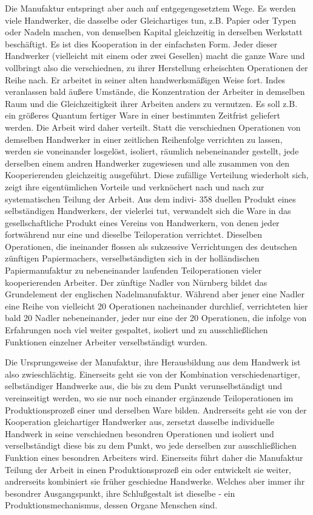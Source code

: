 {Die Manufaktur entspringt aber auch auf entgegengesetztem Wege. Es
werden viele Handwerker, die dasselbe oder Gleichartiges tun, z.B.
Papier oder Typen oder Nadeln machen, von demselben Kapital gleichzeitig
in derselben Werkstatt beschäftigt. Es ist dies Kooperation in der
einfachsten Form. Jeder dieser Handwerker (vielleicht mit einem oder
zwei Gesellen) macht die ganze Ware und vollbringt also die
verschiednen, zu ihrer Herstellung erheischten Operationen der Reihe
nach. Er arbeitet in seiner alten handwerksmäßigen Weise fort. Indes
veranlassen bald äußere Umstände, die Konzentration der Arbeiter in
demselben Raum und die Gleichzeitigkeit ihrer Arbeiten anders zu
vernutzen. Es soll z.B. ein größeres Quantum fertiger Ware in einer
bestimmten Zeitfrist geliefert werden. Die Arbeit wird daher verteilt.
Statt die verschiednen Operationen von demselben Handwerker in einer
zeitlichen Reihenfolge verrichten zu lassen, werden sie voneinander
losgelöst, isoliert, räumlich nebeneinander gestellt, jede derselben
einem andren Handwerker zugewiesen und alle zusammen von den
Kooperierenden gleichzeitig ausgeführt. Diese zufällige Verteilung
wiederholt sich, zeigt ihre eigentümlichen Vorteile und verknöchert nach
und nach zur systematischen Teilung der Arbeit. Aus dem indivi-
\num{358} duellen Produkt eines selbständigen
Handwerkers, der vielerlei tut, verwandelt sich die Ware in das
gesellschaftliche Produkt eines Vereins von Handwerkern, von denen jeder
fortwährend nur eine und dieselbe Teiloperation verrichtet. Dieselben
Operationen, die ineinander flossen als sukzessive Verrichtungen des
deutschen zünftigen Papiermachers, verselbständigten sich in der
holländischen Papiermanufaktur zu nebeneinander laufenden
Teiloperationen vieler kooperierenden Arbeiter. Der zünftige Nadler von
Nürnberg bildet das Grundelement der englischen Nadelmanufaktur. Während
aber jener eine Nadler eine Reihe von vielleicht 20 Operationen
nacheinander durchlief, verrichteten hier bald 20 Nadler nebeneinander,
jeder nur eine der 20 Operationen, die infolge von Erfahrungen noch viel
weiter gespaltet, isoliert und zu ausschließlichen Funktionen einzelner
Arbeiter verselbständigt wurden.

Die Ursprungsweise der Manufaktur, ihre Herausbildung aus dem Handwerk
ist also zwieschlächtig. Einerseits geht sie von der Kombination
verschiedenartiger, selbständiger Handwerke aus, die bis zu dem Punkt
verunselbständigt und vereinseitigt werden, wo sie nur noch einander
ergänzende Teiloperationen im Produktionsprozeß einer und derselben Ware
bilden. Andrerseits geht sie von der Kooperation gleichartiger
Handwerker aus, zersetzt dasselbe individuelle Handwerk in seine
verschiednen besondren Operationen und isoliert und verselbständigt
diese bis zu dem Punkt, wo jede derselben zur ausschließlichen Funktion
eines besondren Arbeiters wird. Einerseits führt daher die Manufaktur
Teilung der Arbeit in einen Produktionsprozeß ein oder entwickelt sie
weiter, andrerseits kombiniert sie früher geschiedne Handwerke. Welches
aber immer ihr besondrer Ausgangspunkt, ihre Schlußgestalt ist dieselbe
- ein Produktionsmechanismus, dessen Organe Menschen sind.

}
